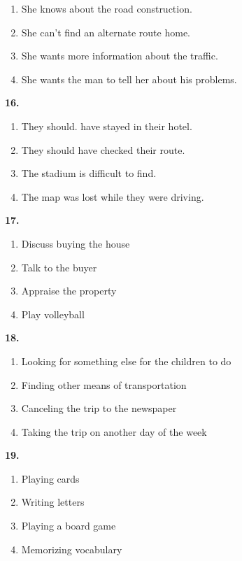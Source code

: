 \documentclass[12pt]{article}
\begin{document}
\begin{enumerate}[label=(\Alph*),leftmargin=*,itemsep=0.2em]
\item She knows about the road construction.
\item She can't find an alternate route home.
\item She wants more information about the traffic.
\item She wants the man to tell her about his problems.
\end{enumerate}
\par
\vspace{0.25\baselineskip}
\noindent\textbf{16.}
\begin{enumerate}[label=(\Alph*),leftmargin=*,itemsep=0.2em]
\item They should. have stayed in their hotel.
\item They should have checked their route.
\item The stadium is difficult to find.
\item The map was lost while they were driving.
\end{enumerate}
\par
\vspace{0.25\baselineskip}
\noindent\textbf{17.}
\begin{enumerate}[label=(\Alph*),leftmargin=*,itemsep=0.2em]
\item Discuss buying the house
\item Talk to the buyer
\item Appraise the property
\item Play volleyball
\end{enumerate}
\par
\vspace{0.25\baselineskip}
\noindent\textbf{18.}
\begin{enumerate}[label=(\Alph*),leftmargin=*,itemsep=0.2em]
\item Looking for something else for the children to do
\item Finding other means of transportation
\item Canceling the trip to the newspaper
\item Taking the trip on another day of the week
\end{enumerate}
\par
\vspace{0.25\baselineskip}
\noindent\textbf{19.}
\begin{enumerate}[label=(\Alph*),leftmargin=*,itemsep=0.2em]
\item Playing cards
\item Writing letters
\item Playing a board game
\item Memorizing vocabulary
\end{enumerate}
\end{document}
